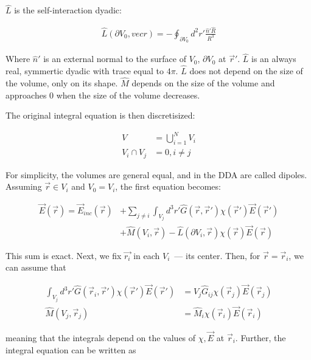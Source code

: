             $\hat{L}$ is the self-interaction dyadic:

            \begin{align}
                \hat{L}(\partial V_0, vec{r}) = -\oint_{\partial V_0} d^2 r' \frac{\hat{n}'\hat{R}}{R^3}
            \end{align}

            Where $\hat{n}'$ is an external normal to the surface of $V_0$, $\partial V_0$ at $\vec{r}'$. $\hat{L}$ is an always real, symmertic dyadic
            with trace equal to $4\pi$. $\hat{L}$ does not depend on the size of the volume, only on its shape. $\hat{M}$ depends on the size of the
            volume and approaches $0$ when the size of the volume decreases.

            The original integral equation is then discretisized:

            \begin{align}
                V &= \bigcup^N_{i=1}V_i \\
                V_i \cap V_j &= 0, i \neq j
            \end{align}

            For simplicity, the volumes are general equal, and in the DDA are called dipoles. Assuming $\vec{r} \in V_i$ and $V_0 = V_i$, the first
            equation becomes:

            \begin{align}
                \vec{E}(\vec{r}) = \vec{E}_{inc}(\vec{r}) &+ \sum_{j\neq i} \int_{V_j} d^3 r'\hat{G}(\vec{r}, \vec{r}')\chi(\vec{r}')\vec{E}(\vec{r}') \nonumber\\
                                                        &+ \hat{M}(V_i, \vec{r}) - \hat{L}(\partial V_i, \vec{r})\chi(\vec{r})\vec{E}(\vec{r})
            \end{align}

            This sum is exact. Next, we fix $\vec{r_i}$ in each $V_i$~--- its center. Then, for $\vec{r}=\vec{r}_i$, we can assume that

            \begin{align}
                \int_{V_j} d^3 r' \hat{G}(\vec{r}_i,\vec{r}')\chi(\vec{r}')\vec{E}(\vec{r}') &= V_j \hat{G}_{ij}\chi(\vec{r}_j)\vec{E}(\vec{r}_j) \\
                \hat{M}(V_j, \vec{r}_j) &= \hat{M}_i \chi(\vec{r}_i)\vec{E}(\vec{r}_i)
            \end{align}

            meaning that the integrals depend on the values of $\chi, \vec{E}$ at $\vec{r}_i$. Further, the integral equation can be written as


